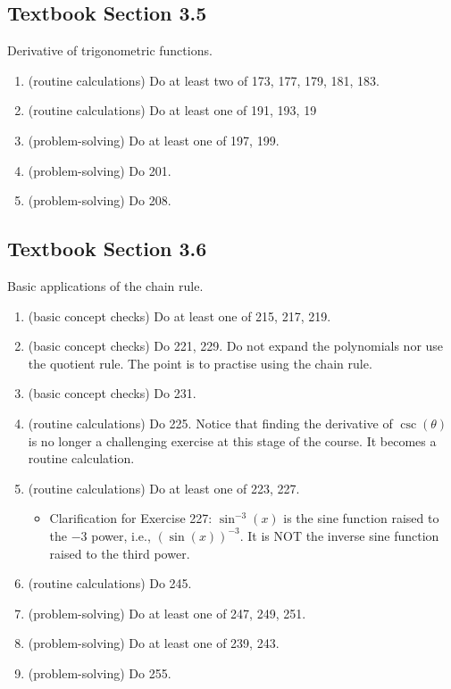 \documentclass[./main.tex]{subfiles}
\begin{document}
\subsection*{Textbook Section 3.5}

Derivative of trigonometric functions.
\begin{enumerate}
  \item (routine calculations) Do at least two of 173, 177, 179, 181, 183.
  \item (routine calculations) Do at least one of 191, 193, 19
  \item (problem-solving) Do at least one of 197, 199.
  \item (problem-solving) Do 201.
  \item (problem-solving) Do 208.
\end{enumerate}

\clearpage
\subsection*{Textbook Section 3.6}

Basic applications of the chain rule.
\begin{enumerate}
  \item (basic concept checks) Do at least one of 215, 217, 219.
  \item (basic concept checks) Do 221, 229. Do not expand the polynomials nor use the quotient rule. The point is to practise using the chain rule.
  \item (basic concept checks) Do 231. 
  \item (routine calculations) Do 225.  Notice that finding the derivative of \(\csc(\theta)\) is no longer a challenging exercise at this stage of the course. It becomes a routine calculation.
  \item (routine calculations) Do at least one of 223, 227. 
    \begin{itemize}
      \item Clarification for Exercise 227: \(\sin^{-3}(x)\) is the sine function raised to the \(-3\) power, i.e., \((\sin(x))^{-3}\). It is NOT the inverse sine function raised to the third power.
    \end{itemize}
  \item (routine calculations) Do 245.
  \item (problem-solving) Do at least one of 247, 249, 251. 
  \item (problem-solving) Do at least one of 239, 243.
  \item (problem-solving) Do 255.
\end{enumerate}
\end{document}
